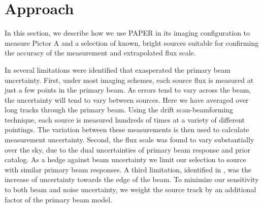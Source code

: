 \documentclass[preprint]{aastex}
\begin{document}
\section{Approach}
\label{sec:approach}
In this section, we describe how we use PAPER in its imaging configuration
to measure Pictor A and a selection of known, bright sources suitable for confirming the accuracy of the measurement
and extrapolated flux scale.

 In \citet{Jacobs:2013p9837} several limitations were identified that
exasperated the primary beam uncertainty.  First, under most imaging schemes, each source flux is measured at just a few 
points in the primary beam. As errors tend to vary across the beam, the uncertainty will tend to vary between sources.
Here we have averaged over long tracks through the primary beam. Using the drift scan-beamforming technique, each 
source is measured hundreds of times at a variety of different pointings. The variation between these measurements is then
used to calculate measurement uncertainty. Second, the flux scale was found to vary substantially over the 
sky, due to the dual uncertainties of primary beam response and prior catalog. As a hedge against beam uncertainty 
we limit our selection to source with similar primary beam responses. A third limitation, identified in \citet{Williams:2012p8768},
was the increase of uncertainty towards the edge of the beam. To minimize our sensitivity to both beam and noise
uncertainty, we weight the source track by an additional factor of the primary beam model.  
\end{document}
